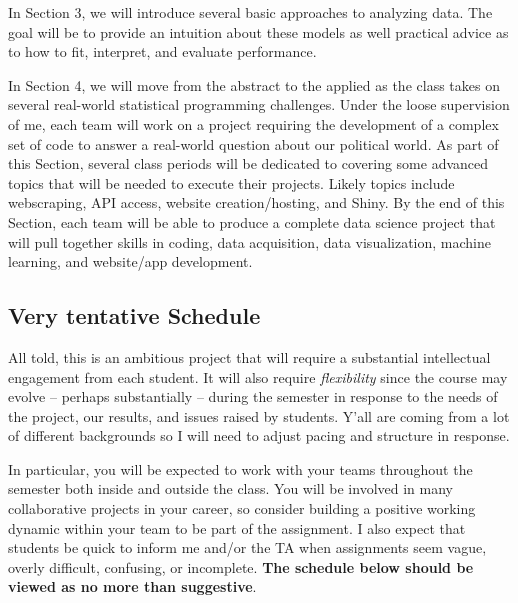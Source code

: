 \documentclass[11pt]{article}
\begin{document}
In Section 3, we will introduce several basic approaches to analyzing
data.  The goal will be to provide an intuition about these models as
well practical advice as to how to fit, interpret, and evaluate performance.  

In Section 4, we will move from the abstract to the applied as the
class takes on several real-world statistical programming challenges.
Under the loose supervision of me, each team will work on a project
requiring the development of a complex set of code to answer a
real-world question about our political world.  As part of this
Section, several class periods will be dedicated to covering some
advanced topics that will be needed to execute their projects.  Likely
topics include webscraping, API access,  website
creation/hosting, and Shiny.  By the end of this Section, each team
will be able to produce a complete data science project that will pull
together skills in coding, data acquisition, data visualization,
machine learning, and website/app development.

\subsection*{Very tentative Schedule}

All told, this is an ambitious project that will require a substantial
intellectual engagement from each student. It will also require
\textit{flexibility} since the course may evolve -- perhaps
substantially -- during the semester in response to the needs of the
project, our results, and issues raised by students.  Y'all are coming from a lot of different backgrounds so I will need to adjust pacing and structure in response.

In particular, you will be expected to work with your teams throughout
the semester both inside and outside the class. You will be involved
in many collaborative projects in your career, so consider building a
positive working dynamic within your team to be part of the
assignment.  I also expect that students be quick to inform me and/or
the TA when assignments seem vague, overly difficult, confusing, or
incomplete.  \textbf{The schedule below should be viewed as no more than
suggestive}.
\end{document}
